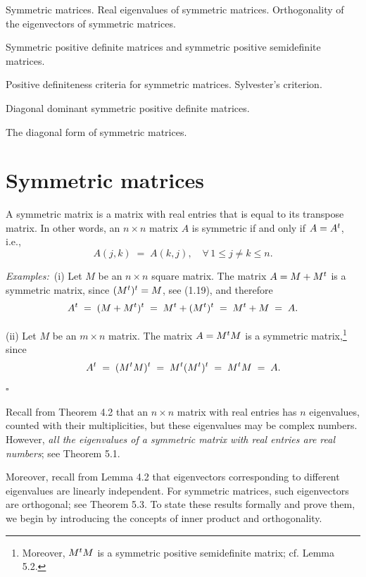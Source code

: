 
\noindent Symmetric matrices. Real eigenvalues of symmetric matrices. Orthogonality of the
eigenvectors of symmetric matrices.
\medskip

\noindent Symmetric positive definite matrices and symmetric positive semidefinite matrices.
\medskip

\noindent Positive definiteness criteria for symmetric matrices. Sylvester's criterion.
\medskip

\noindent Diagonal dominant symmetric positive definite matrices.
\medskip

\noindent The diagonal form of symmetric matrices.
\medskip

\section{Symmetric matrices}

\begin{definition}
A symmetric matrix is a matrix with real entries that is equal to its transpose matrix.
In other words, an $n \times n$ matrix $A$ is symmetric if and only if $A = A^{t}$, i.e.,
\begin{equation}
A(j,k) \;=\; A(k,j), \quad \forall\, 1 \leq j \neq k \leq n.
\end{equation}
\end{definition}

\par\medskip\noindent\textit{Examples:}\ (i) Let $M$ be an $n \times n$ square matrix. The
matrix $A = M + M^{t}$ is a symmetric matrix, since $(M^{t})^{t} = M$, see (1.19), and
therefore
\[
A^{t} \;=\; (M+M^{t})^{t} \;=\; M^{t}+(M^{t})^{t} \;=\; M^{t}+M \;=\; A.
\]

(ii) Let $M$ be an $m \times n$ matrix. The matrix $A = M^{t} M$ is a symmetric
matrix,\footnote{Moreover, $M^{t} M$ is a symmetric positive semidefinite matrix; cf.
Lemma 5.2.} since
\[
A^{t} \;=\; (M^{t} M)^{t} \;=\; M^{t}(M^{t})^{t} \;=\; M^{t} M \;=\; A.
\]
\hfill$\square$
\par\medskip

Recall from Theorem 4.2 that an $n \times n$ matrix with real entries has $n$
eigenvalues, counted with their multiplicities, but these eigenvalues may be complex
numbers. However, \textit{all the eigenvalues of a symmetric matrix with real entries
are real numbers}; see Theorem 5.1.

Moreover, recall from Lemma 4.2 that eigenvectors corresponding to different
eigenvalues are linearly independent. For symmetric matrices, such eigenvectors are
orthogonal; see Theorem 5.3. To state these results formally and prove them, we begin
by introducing the concepts of inner product and orthogonality.

